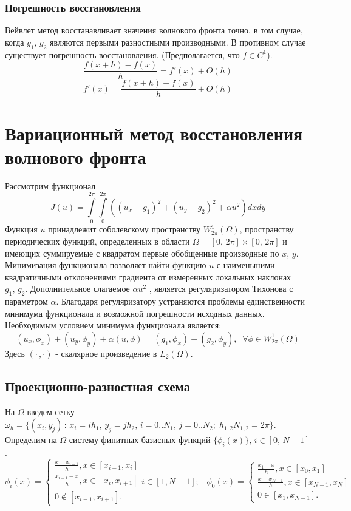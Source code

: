 \documentclass{article}
\begin{document}
\subsubsection{Погрешность восстановления}
Вейвлет метод восстанавливает значения волнового фронта точно, в том случае, когда $g_1,\, g_2$ являются первыми разностными производными. В противном случае существует погрешность восстановления. (Предполагается, что $f \in C^1$).
$$\frac{f(x+h)-f(x)}{h} = f'(x) + O(h)$$
$$f'(x) = \frac{f(x+h)-f(x)}{h} + O(h)$$
\section{Вариационный метод восстановления волнового фронта}

Рассмотрим функционал $$J(u) = \int \limits_0^{2\pi} \int \limits_0^{2\pi} ((u_x - g_1)^2 + (u_y-g_2)^2 + \alpha u^2 )dxdy$$
Функция $u$ принадлежит соболевскому пространству $W_{2\pi}^{1}(\Omega)$, пространству периодических функций, определенных в области $\Omega = [0,\,2\pi]  \times [0,\,2\pi]$ и имеющих суммируемые с квадратом первые обобщенные производные по $x,\,y$. Минимизация функционала позволяет найти функцию $u$ с наименьшими квадратичными отклонениями градиента от измеренных локальных наклонах $g_1,\, g_2$. Дополнительное слагаемое $\alpha u^2$ , является регуляризатором Тихонова с параметром $\alpha$. Благодаря регуляризатору устраняются проблемы единственности минимума функционала и возможной погрешности исходных данных. Необходимым условием минимума функционала является:
\begin{equation}\label{nessasary condition}
(u_x, \phi_x) + (u_y,\phi_y) + \alpha(u, \phi) = (g_1, \phi_x) + (g_2, \phi_y),\;\;\forall\phi \in W_{2\pi}^{1}(\Omega)
\end{equation}
Здесь $(\cdot\,,\cdot)$ - скалярное произведение в $L_2(\Omega)$.
\subsection{Проекционно-разностная схема}
На $\Omega$ введем сетку $\omega_h = \{(x_i, y_j) \,:\, x_i = ih_1,\,y_j = jh_2,\, i = 0..N_1,\, j = 0..N_2;\; h_{1,2}N_{1,2} = 2\pi\}$. Определим на $\Omega$ систему финитных базисных функций $\{\phi_i(x)\} ,\, i \in [0,\,N-1]$.
$$
\phi_i(x) = 
 \begin{cases}
  \frac{x-x_{i-1}}{h} , x \in [x_{i-1},x_i] \\ 
   \frac{x_{i+1} - x}{h}, x \in [x_{i},x_{i+1}]   \\
   0 \notin [x_{i-1},x_{i+1}].
 \end{cases} i \in [1, N-1];\;\;\;
\phi_0(x) = 
 \begin{cases}
  \frac{x_1-x}{h} , x \in [x_{0},x_1] \\ 
   \frac{x - x_{N-1}}{h}, x \in [x_{N-1},x_{N}]   \\
   0 \in [x_{1},x_{N-1}].
 \end{cases}
$$
\end{document}
